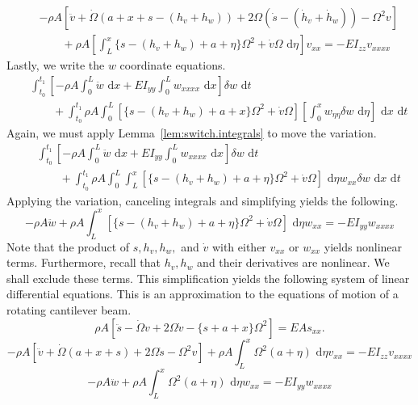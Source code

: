 \begin{eqnarray}
& & -\rho A [\ddot v + \dot \Omega (a+x+s-(h_v+h_w))+2\Omega(\dot s - (\dot h_v+\dot h_w))-\Omega^2v] \\ 
& & \qquad +\rho A \left[\int_L^x\lbrace s-(h_v+h_w)+a+\eta\rbrace\Omega^2+\dot v\Omega\text{ d}\eta\right] v_{xx} = -EI_{zz}v_{xxxx}\nonumber
\end{eqnarray}
Lastly, we write the $w$ coordinate equations.
\begin{eqnarray}
& & \int_{t_0}^{t_1}\left[-\rho A\int_0^L \ddot w\text{ d}x+EI_{yy}\int_0^L w_{xxxx}\text{ d}x\right]\delta w\text{ d}t \\
& & \qquad +\int_{t_0}^{t_1}\rho A\int_0^L  [\lbrace s-(h_v+h_w)+a+x\rbrace\Omega^2+\dot v\Omega]\left[\int_0^xw_{\eta\eta}\delta w\text{ d}\eta\right]\text{ d}x\text{ d}t\nonumber 
\end{eqnarray}
Again, we must apply Lemma~\ref{lem:switch.integrals} to move the variation.
\begin{eqnarray}
& & \int_{t_0}^{t_1}\left[-\rho A\int_0^L \ddot w\text{ d}x+EI_{yy}\int_0^L w_{xxxx}\text{ d}x\right]\delta w\text{ d}t \\
& & \qquad +\int_{t_0}^{t_1}\rho A\int_0^L \int_L^x[\lbrace s-(h_v+h_w)+a+\eta \rbrace\Omega^2+\dot v\Omega]\text{ d}\eta w_{xx}\delta w\text{ d}x\text{ d}t\nonumber 
\end{eqnarray}
Applying the variation, canceling integrals and simplifying yields the following.
\begin{equation}
-\rho A \ddot w+\rho A \int_L^x[\lbrace s-(h_v+h_w)+a+\eta \rbrace\Omega^2+\dot v\Omega]\text{ d}\eta w_{xx} = -EI_{yy} w_{xxxx}
\end{equation}
Note that the product of $s,h_v,h_w,$ and $\dot v$ with either $v_{xx}$ or $w_{xx}$ yields nonlinear terms. Furthermore, recall that $h_v,h_w$ and their derivatives are nonlinear. We shall exclude these terms. This simplification yields the following system of linear differential equations. This is an approximation to the equations of motion of a rotating cantilever beam.
\begin{equation}
\rho A \left[\ddot s-\dot \Omega v+2\Omega\dot v-\lbrace s+a+x\rbrace\Omega^2\right] = EAs_{xx}.
\end{equation}
\begin{equation}
-\rho A [\ddot v + \dot \Omega (a+x+s)+2\Omega\dot s-\Omega^2v]+\rho A \int_L^x\Omega^2(a+\eta)\text{ d}\eta v_{xx} = -EI_{zz}v_{xxxx} 
\end{equation}
\begin{equation}
-\rho A \ddot w+\rho A \int_L^x\Omega^2(a+\eta)\text{ d}\eta w_{xx} = -EI_{yy} w_{xxxx}
\end{equation}

